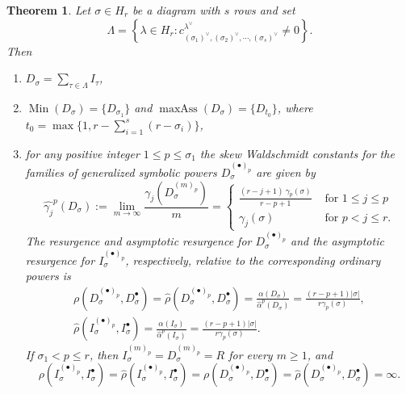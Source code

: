 \documentclass[11pt, reqno]{amsart}
\numberwithin{equation}{section}
\newtheorem{theorem}{Theorem}[section]
\theoremstyle{definition}
\DeclareMathOperator{\Min}{Min}
\DeclareMathOperator{\maxass}{maxAss}
\renewcommand{\l}{\lambda}
\newcommand{\s}{\sigma}
\begin{document}
\begin{theorem}\label{thm: Ds}
Let $\s \in H_r$ be a diagram with $s$ rows and set
\[
\Lambda= \left\{ \l \in H_r : c_{(\s_1)^\vee,(\s_2)^\vee,\cdots ,(\s_s)^\vee}^{\l^\vee}\neq 0\right \}.
\]
Then

\begin{enumerate}
	\item $D_\sigma=\sum_{\tau \in \Lambda} I_\tau$,
	\item $\Min(D_\sigma)=\{D_{\s_1} \}$ and $\maxass(D_\sigma)=\{D_{t_0} \}$, where $t_0=\max\{1, r- \sum_{i=1}^s (r-\sigma_i)\}$,
	\item for any positive integer $1\leq p\leq \s_1$ the skew
Waldschmidt constants for the families of generalized symbolic powers $D_\s^{(\bullet)_p}$ are given by
\[
\widehat{\gamma_j}^p(D_\s):=\lim_{m\to\infty}\frac{\gamma_j\left (D_\s^{(m)_p}\right )}{m}=
\begin{cases}
\frac{(r-j+1) \ \gamma_{p}(\s)}{r-p+1} & \text{ for } 1\leq j\leq p\\
\gamma_j(\s)& \text{ for } p< j\leq r.
\end{cases}
\]
The resurgence and asymptotic resurgence for   $D_\s^{(\bullet)_p}$ and the asymptotic resurgence for  $I_\s^{(\bullet)_p}$, respectively, relative to the corresponding ordinary powers is
\begin{eqnarray*}
{\rho}(D_\s^{(\bullet)_p}, D_\s^\bullet)=\widehat{\rho}(D_\s^{(\bullet)_p}, D_\s^\bullet)=\frac{\alpha(D_\s)}{\widehat{\alpha}^p(D_\s)}=\frac{(r-p+1)|\s|}{r\gamma_p(\s)}, \\
\widehat{\rho}(I_\s^{(\bullet)_p}, I_\s^\bullet)=\frac{\alpha(I_\s)}{\widehat{\alpha}^p(I_\s)}=\frac{(r-p+1)|\s|}{r\gamma_p(\s)}.
\end{eqnarray*}
If $\s_1<p\leq r$, then $I_\s^{(m)_p}=D_\s^{(m)_p}=R$ for every $m\geq1$, and
\[
\rho(I_\s^{(\bullet)_p}, I_\s^\bullet)=\widehat{\rho}(I_\s^{(\bullet)_p}, I_\s^\bullet)=\rho(D_\s^{(\bullet)_p},D_\s^\bullet)
=\widehat{\rho}(D_\s^{(\bullet)_p},D_\s^\bullet)=\infty.
\]
\end{enumerate}
	\end{theorem}
\end{document}

